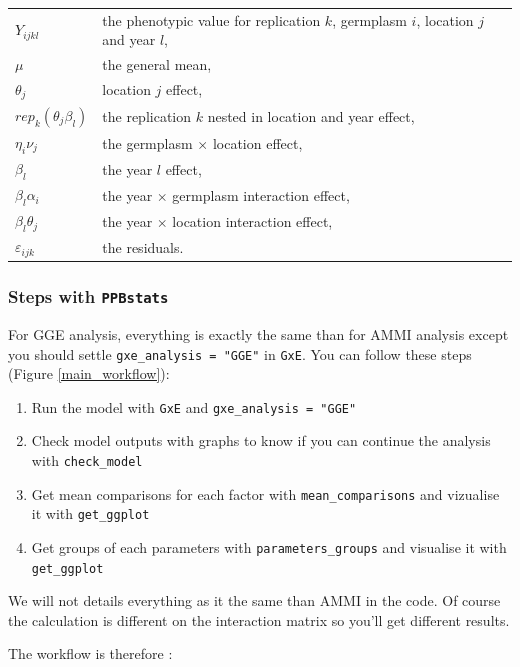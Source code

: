 \documentclass{article}\usepackage[]{graphicx}\usepackage[]{color}
\newcommand{\pack}{\texttt{PPBstats}}
\begin{document}
\begin{tabular}{ll}
$Y_{ijkl}$ & the phenotypic value for replication $k$, germplasm $i$, location $j$ and year $l$, \\
$\mu$ & the general mean, \\
$\theta_{j}$ & location $j$ effect, \\
$rep_{k}(\theta_{j}\beta_{l})$ & the replication $k$ nested in location and year effect, \\
$\eta_{i}\nu_{j}$ & the germplasm $\times$ location effect, \\
$\beta_{l}$ & the year $l$ effect, \\
$\beta_{l}\alpha_{i}$ & the year $\times$ germplasm interaction effect, \\
$\beta_{l}\theta_{j}$ & the year $\times$ location interaction effect, \\
$\varepsilon_{ijk}$ & the residuals.\\
\end{tabular}


\subsubsection{Steps with \pack}


For GGE analysis, everything is exactly the same than for AMMI analysis except you should settle \texttt{gxe\_analysis = "GGE"} in \texttt{GxE}.
You can follow these steps (Figure \ref{main_workflow}):

\begin{enumerate}
\item Run the model with \texttt{GxE} and \texttt{gxe\_analysis = "GGE"}
\item Check model outputs with graphs to know if you can continue the analysis with \texttt{check\_model}
\item Get mean comparisons for each factor with \texttt{mean\_comparisons} and vizualise it with \texttt{get\_ggplot}
\item Get groups of each parameters with \texttt{parameters\_groups} and visualise it with \texttt{get\_ggplot}
\end{enumerate}

We will not details everything as it the same than AMMI in the code.
Of course the calculation is different on the interaction matrix so you'll get different results.

The workflow is therefore :
\end{document}
